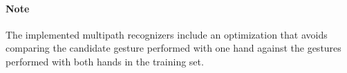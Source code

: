 \paragraph{Note}
The implemented multipath recognizers include an optimization that avoids comparing the candidate gesture performed with one hand against the gestures performed with both hands in the training set.


